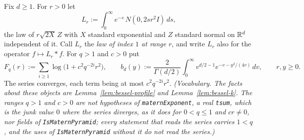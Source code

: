 \begin{definition}
\label{def:matern-pyramid-data}
\leanok
Fix $d \ge 1$. For $r > 0$ let
\[
  L_r := \int_0^\infty e^{-s}\,N(0, 2sr^2I)\,ds ,
\]
the law of $r\sqrt{2X}\,Z$ with $X$ standard exponential and $Z$ standard normal on $\mathbb{R}^d$
independent of it. Call $L_r$ the \emph{\Matern{} law of index $1$ at range $r$}, and write $L_r$
also for the operator $f \mapsto L_r * f$. For $q > 1$ and $c > 0$ put
\[
  F_q(r) := \sum_{i \ge 1}\log\bigl(1 + c^2q^{-2i}r^2\bigr), \qquad
  b_d(y) := \frac{2}{\Gamma(d/2)}\int_0^\infty v^{d/2-1}e^{-v-y^2/(4v)}\,dv ,
  \qquad r, y \ge 0 .
\]
The series converges, each term being at most $c^2q^{-2i}r^2$.
\statusT\quad\emph{(Vocabulary. The facts about these objects are Lemma~\ref{lem:bessel-profile}
and Lemma~\ref{lem:bessel-k}. The ranges $q > 1$ and $c > 0$ are not hypotheses of
\texttt{maternExponent}, a real \texttt{tsum}, which is the junk value $0$ where the series diverges,
as it does for $0 < q \le 1$ and $cr \ne 0$, nor fields of \texttt{IsMaternPyramid}; every statement that reads the series
carries $1 < q$, and the uses of \texttt{IsMaternPyramid} without it do not read the series.)}
\end{definition}

